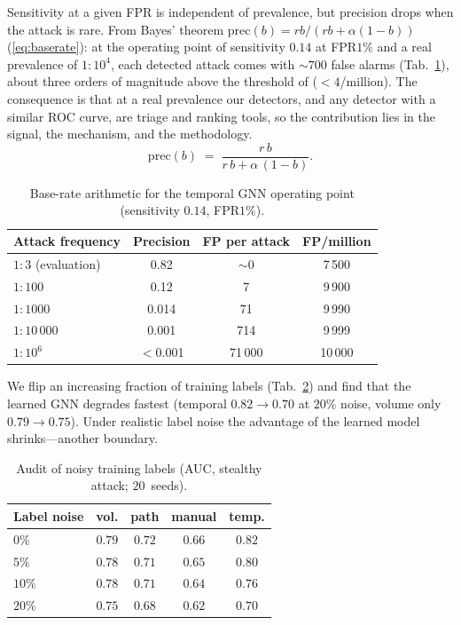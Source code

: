 Sensitivity at a given FPR is independent of prevalence, but
precision drops when the attack is rare. From Bayes' theorem $\mathrm{prec}(b)=rb/(rb+\alpha(1-b))$
(\ref{eq:baserate}): at the operating point of sensitivity $0.14$ at FPR$1\%$ and a real prevalence of
$1{:}10^4$, each detected attack comes with $\sim\!700$ false alarms (Tab.~\ref{tab:baserate}), about three orders
of magnitude above the threshold of \citet{ho2019detecting} ($<\!4$/million). The consequence is that at a real
prevalence our detectors, and any detector with a similar ROC curve, are triage and ranking tools, so the contribution lies in the signal, the mechanism, and the methodology.
\begin{equation}
\mathrm{prec}(b) \;=\; \frac{r\,b}{r\,b + \alpha\,(1-b)}.
\label{eq:baserate}
\end{equation}

\begin{table}[t]\centering
\begin{tabular}{lccc}
\toprule
Attack frequency & Precision & FP per attack & FP/million \\
\midrule
$1{:}3$ (evaluation) & 0.82 & $\sim$0 & 7\,500 \\
$1{:}100$           & 0.12 & 7        & 9\,900 \\
$1{:}1000$          & 0.014 & 71      & 9\,990 \\
$1{:}10\,000$       & 0.001 & 714     & 9\,999 \\
$1{:}10^6$          & $<$0.001 & 71\,000 & 10\,000 \\
\bottomrule
\end{tabular}
\caption{Base-rate arithmetic for the temporal GNN operating point (sensitivity $0.14$,
FPR$1\%$).}
\label{tab:baserate}
\end{table}

We flip an increasing fraction of training labels
(Tab.~\ref{tab:labelnoise}) and find that the learned GNN degrades fastest (temporal $0.82\!\to\!0.70$ at $20\%$ noise, volume
only $0.79\!\to\!0.75$). Under realistic label noise the advantage of the learned model shrinks---another boundary.

\begin{table}[t]\centering
\begin{tabular}{lcccc}
\toprule
Label noise & vol. & path & manual & temp. \\
\midrule
$0\%$   & $0.79$ & $0.72$ & $0.66$ & $\mathbf{0.82}$ \\
$5\%$   & $0.78$ & $0.71$ & $0.65$ & $\mathbf{0.80}$ \\
$10\%$  & $0.78$ & $0.71$ & $0.64$ & $\mathbf{0.76}$ \\
$20\%$  & $\mathbf{0.75}$ & $0.68$ & $0.62$ & $0.70$ \\
\bottomrule
\end{tabular}
\caption{Audit of noisy training labels (AUC, stealthy attack; $20$~seeds).}
\label{tab:labelnoise}
\end{table}

